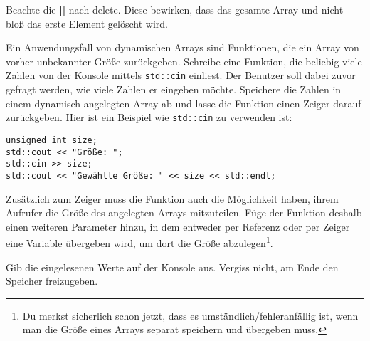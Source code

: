 Beachte die \textbf{[]} nach delete.
Diese bewirken, dass das gesamte Array und nicht bloß das erste Element gelöscht wird.

Ein Anwendungsfall von dynamischen Arrays sind Funktionen, die ein Array von vorher unbekannter Größe zurückgeben.
Schreibe eine Funktion, die beliebig viele Zahlen von der Konsole mittels \texttt{std::cin} einliest.
Der Benutzer soll dabei zuvor gefragt werden, wie viele Zahlen er eingeben möchte.
Speichere die Zahlen in einem dynamisch angelegten Array ab und lasse die Funktion einen Zeiger darauf zurückgeben.
Hier ist ein Beispiel wie \texttt{std::cin} zu verwenden ist:

\begin{lstlisting}
unsigned int size;
std::cout << "Größe: ";
std::cin >> size;
std::cout << "Gewählte Größe: " << size << std::endl;
\end{lstlisting}

Zusätzlich zum Zeiger muss die Funktion auch die Möglichkeit haben, ihrem Aufrufer die Größe des angelegten Arrays mitzuteilen.
Füge der Funktion deshalb einen weiteren Parameter hinzu, in dem entweder per Referenz oder per Zeiger eine Variable übergeben wird, um dort die Größe abzulegen\footnote{Du merkst sicherlich schon jetzt, dass es umständlich/fehleranfällig ist, wenn man die Größe eines Arrays separat speichern und übergeben muss.}.

Gib die eingelesenen Werte auf der Konsole aus.
Vergiss nicht, am Ende den Speicher freizugeben.
